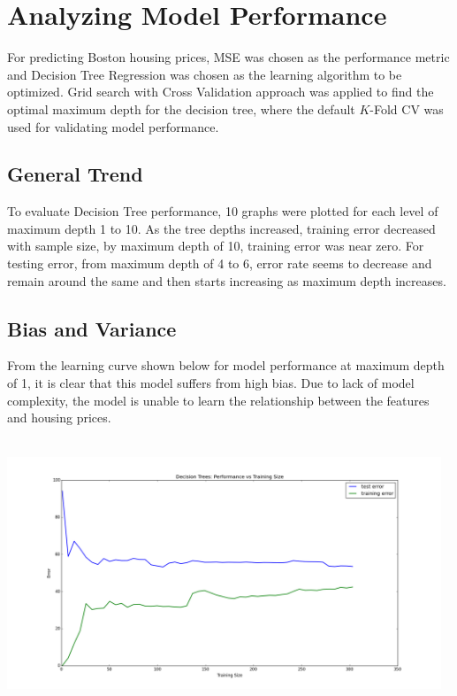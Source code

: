 \documentclass[12pt, letterpaper]{article}
\begin{document}
\section{Analyzing Model Performance}

For predicting Boston housing prices, MSE was chosen as the performance metric and Decision Tree Regression was chosen as the learning algorithm to be optimized. Grid search with Cross Validation approach was applied to find the optimal maximum depth for the decision tree, where the default $K$-Fold CV was used for validating model performance. 

\subsection{General Trend}

To evaluate Decision Tree performance, 10 graphs were plotted for each level of maximum depth 1 to 10. As the tree depths increased, training error decreased with sample size, by maximum depth of 10, training error was near zero. For testing error, from maximum depth of 4 to 6, error rate seems to decrease and remain around the same and then starts increasing as maximum depth increases. 

\subsection{Bias and Variance}

From the learning curve shown below for model performance at maximum depth of 1, it is clear that this model suffers from high bias. Due to lack of model complexity, the model is unable to learn the relationship between the features and housing prices.

\begin{center}
\includegraphics[width=13cm,height=8cm]{DT1}
\end{center}
\end{document}
